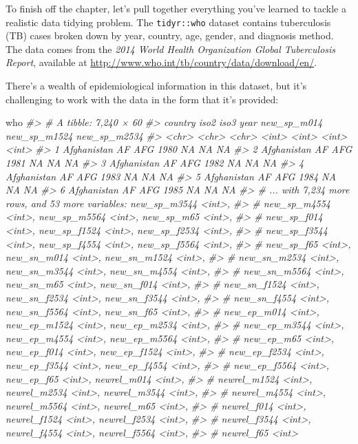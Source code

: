\documentclass[]{book}
\newenvironment{Shaded}{\begin{snugshade}}{\end{snugshade}}
\newcommand{\CommentTok}[1]{\textcolor[rgb]{0.56,0.35,0.01}{\textit{{#1}}}}
\newcommand{\NormalTok}[1]{{#1}}
\begin{document}
To finish off the chapter, let's pull together everything you've learned
to tackle a realistic data tidying problem. The \texttt{tidyr::who}
dataset contains tuberculosis (TB) cases broken down by year, country,
age, gender, and diagnosis method. The data comes from the \emph{2014
World Health Organization Global Tuberculosis Report}, available at
\url{http://www.who.int/tb/country/data/download/en/}.

There's a wealth of epidemiological information in this dataset, but
it's challenging to work with the data in the form that it's provided:

\begin{Shaded}
\begin{Highlighting}[]
\NormalTok{who}
\CommentTok{#> # A tibble: 7,240 × 60}
\CommentTok{#>       country  iso2  iso3  year new_sp_m014 new_sp_m1524 new_sp_m2534}
\CommentTok{#>         <chr> <chr> <chr> <int>       <int>        <int>        <int>}
\CommentTok{#> 1 Afghanistan    AF   AFG  1980          NA           NA           NA}
\CommentTok{#> 2 Afghanistan    AF   AFG  1981          NA           NA           NA}
\CommentTok{#> 3 Afghanistan    AF   AFG  1982          NA           NA           NA}
\CommentTok{#> 4 Afghanistan    AF   AFG  1983          NA           NA           NA}
\CommentTok{#> 5 Afghanistan    AF   AFG  1984          NA           NA           NA}
\CommentTok{#> 6 Afghanistan    AF   AFG  1985          NA           NA           NA}
\CommentTok{#> # ... with 7,234 more rows, and 53 more variables: new_sp_m3544 <int>,}
\CommentTok{#> #   new_sp_m4554 <int>, new_sp_m5564 <int>, new_sp_m65 <int>,}
\CommentTok{#> #   new_sp_f014 <int>, new_sp_f1524 <int>, new_sp_f2534 <int>,}
\CommentTok{#> #   new_sp_f3544 <int>, new_sp_f4554 <int>, new_sp_f5564 <int>,}
\CommentTok{#> #   new_sp_f65 <int>, new_sn_m014 <int>, new_sn_m1524 <int>,}
\CommentTok{#> #   new_sn_m2534 <int>, new_sn_m3544 <int>, new_sn_m4554 <int>,}
\CommentTok{#> #   new_sn_m5564 <int>, new_sn_m65 <int>, new_sn_f014 <int>,}
\CommentTok{#> #   new_sn_f1524 <int>, new_sn_f2534 <int>, new_sn_f3544 <int>,}
\CommentTok{#> #   new_sn_f4554 <int>, new_sn_f5564 <int>, new_sn_f65 <int>,}
\CommentTok{#> #   new_ep_m014 <int>, new_ep_m1524 <int>, new_ep_m2534 <int>,}
\CommentTok{#> #   new_ep_m3544 <int>, new_ep_m4554 <int>, new_ep_m5564 <int>,}
\CommentTok{#> #   new_ep_m65 <int>, new_ep_f014 <int>, new_ep_f1524 <int>,}
\CommentTok{#> #   new_ep_f2534 <int>, new_ep_f3544 <int>, new_ep_f4554 <int>,}
\CommentTok{#> #   new_ep_f5564 <int>, new_ep_f65 <int>, newrel_m014 <int>,}
\CommentTok{#> #   newrel_m1524 <int>, newrel_m2534 <int>, newrel_m3544 <int>,}
\CommentTok{#> #   newrel_m4554 <int>, newrel_m5564 <int>, newrel_m65 <int>,}
\CommentTok{#> #   newrel_f014 <int>, newrel_f1524 <int>, newrel_f2534 <int>,}
\CommentTok{#> #   newrel_f3544 <int>, newrel_f4554 <int>, newrel_f5564 <int>,}
\CommentTok{#> #   newrel_f65 <int>}
\end{Highlighting}
\end{Shaded}
\end{document}
